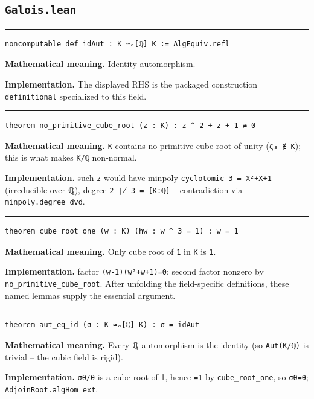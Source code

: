 \documentclass[UTF8,a4paper,11pt,fontset=fandol]{ctexart}
\theoremstyle{definition}
\newcommand{\statementsep}{\par\medskip\hrule\medskip}
\begin{document}
\subsection{\texttt{Galois.lean}}

\statementsep
\begin{verbatim}
noncomputable def idAut : K ≃ₐ[ℚ] K := AlgEquiv.refl
\end{verbatim}
\noindent\textbf{Mathematical meaning.} Identity automorphism.\par
\noindent\textbf{Implementation.} The displayed RHS is the packaged construction \texttt{definitional} specialized to this field.\par
\statementsep
\begin{verbatim}
theorem no_primitive_cube_root (z : K) : z ^ 2 + z + 1 ≠ 0
\end{verbatim}
\noindent\textbf{Mathematical meaning.} \texttt{K} contains no primitive cube root of unity (\texttt{ζ₃ ∉ K}); this is what makes \texttt{K/\allowbreak{}ℚ} non-normal.\par
\noindent\textbf{Implementation.} such \texttt{z} would have minpoly \texttt{cyclotomic 3 = X²+X+1} (irreducible over ℚ), degree \texttt{2 ∤ 3 = [K:ℚ]} -- contradiction via \texttt{minpoly.\allowbreak{}degree\_\allowbreak{}dvd}.\par
\statementsep
\begin{verbatim}
theorem cube_root_one (w : K) (hw : w ^ 3 = 1) : w = 1
\end{verbatim}
\noindent\textbf{Mathematical meaning.} Only cube root of \texttt{1} in \texttt{K} is \texttt{1}.\par
\noindent\textbf{Implementation.} factor \texttt{(w-1)(w²+w+1)=0}; second factor nonzero by \texttt{no\_\allowbreak{}primitive\_\allowbreak{}cube\_\allowbreak{}root}. After unfolding the field-specific definitions, these named lemmas supply the essential argument.\par
\statementsep
\begin{verbatim}
theorem aut_eq_id (σ : K ≃ₐ[ℚ] K) : σ = idAut
\end{verbatim}
\noindent\textbf{Mathematical meaning.} Every ℚ-automorphism is the identity (so \texttt{Aut(K/\allowbreak{}ℚ)} is trivial -- the cubic field is rigid).\par
\noindent\textbf{Implementation.} \texttt{σθ/\allowbreak{}θ} is a cube root of 1, hence \texttt{=1} by \texttt{cube\_\allowbreak{}root\_\allowbreak{}one}, so \texttt{σθ=θ}; \texttt{AdjoinRoot.\allowbreak{}algHom\_\allowbreak{}ext}.\par
\end{document}
